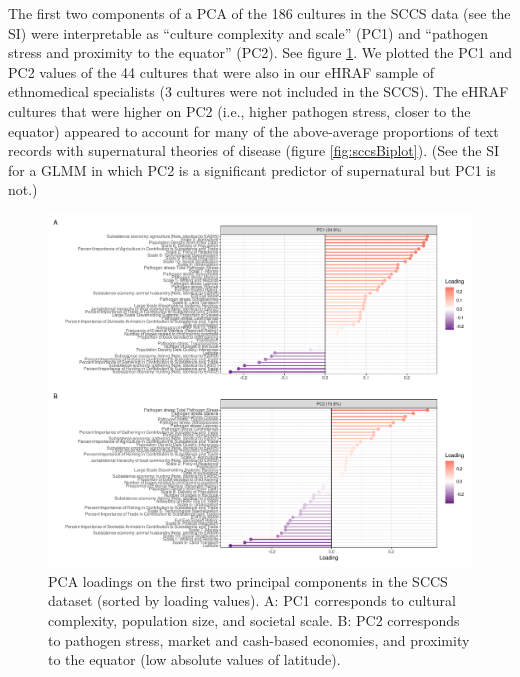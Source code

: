 \documentclass[
  11pt,
]{article}
\begin{document}
The first two components of a PCA of the 186 cultures in the SCCS data (see the SI) were interpretable as ``culture complexity and scale'' (PC1) and ``pathogen stress and proximity to the equator'' (PC2). See figure \ref{fig:sccsPCAloadings}. We plotted the PC1 and PC2 values of the 44 cultures that were also in our eHRAF sample of ethnomedical specialists (3 cultures were not included in the SCCS). The eHRAF cultures that were higher on PC2 (i.e., higher pathogen stress, closer to the equator) appeared to account for many of the above-average proportions of text records with supernatural theories of disease (figure \ref{fig:sccsBiplot}). (See the SI for a GLMM in which PC2 is a significant predictor of supernatural but PC1 is not.)

\begin{landscape}

\begin{figure}[p]

{\centering \includegraphics{magic-healers-article2_files/figure-latex/sccsPCAloadings-1} 

}

\caption{PCA loadings on the first two principal components in the SCCS dataset (sorted by loading values). A: PC1 corresponds to cultural complexity, population size, and societal scale. B: PC2 corresponds to pathogen stress, market and cash-based economies, and proximity to the equator (low absolute values of latitude).}\label{fig:sccsPCAloadings}
\end{figure}




\end{landscape}
\end{document}

